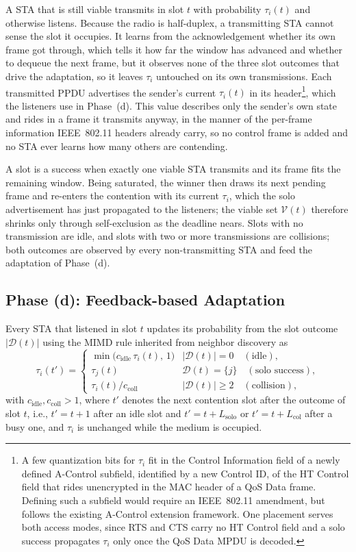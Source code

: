 \documentclass[conference]{IEEEtran}
\begin{document}
A STA that is still viable transmits in slot $t$ with probability $\tau_i(t)$ and otherwise listens. Because the radio is half-duplex, a transmitting STA cannot sense the slot it occupies. It learns from the acknowledgement whether its own frame got through, which tells it how far the window has advanced and whether to dequeue the next frame, but it observes none of the three slot outcomes that drive the adaptation, so it leaves $\tau_i$ untouched on its own transmissions. Each transmitted PPDU advertises the sender's current $\tau_i(t)$ in its header\footnote{A few quantization bits for $\tau_i$ fit in the Control Information field of a newly defined A-Control subfield, identified by a new Control ID, of the HT Control field that rides unencrypted in the MAC header of a QoS Data frame. Defining such a subfield would require an IEEE~802.11 amendment, but follows the existing A-Control extension framework. One placement serves both access modes, since RTS and CTS carry no HT Control field and a solo success propagates $\tau_i$ only once the QoS Data MPDU is decoded.}, which the listeners use in Phase~(d). This value describes only the sender's own state and rides in a frame it transmits anyway, in the manner of the per-frame information IEEE~802.11 headers already carry, so no control frame is added and no STA ever learns how many others are contending.

A slot is a success when exactly one viable STA transmits and its frame fits the remaining window. Being saturated, the winner then draws its next pending frame and re-enters the contention with its current $\tau_i$, which the solo advertisement has just propagated to the listeners; the viable set $\mathcal{V}(t)$ therefore shrinks only through self-exclusion as the deadline nears. Slots with no transmission are idle, and slots with two or more transmissions are collisions; both outcomes are observed by every non-transmitting STA and feed the adaptation of Phase~(d).

\subsection{Phase (d): Feedback-based Adaptation}
\label{subsec:adaptive_control}

Every STA that listened in slot $t$ updates its probability from the slot outcome $|\mathcal{D}(t)|$ using the MIMD rule inherited from neighbor discovery as
\begin{equation}
\tau_i(t') =
\begin{cases}
\min\bigl(c_\mathrm{idle}\,\tau_i(t),\,1\bigr) & |\mathcal{D}(t)|=0 \quad(\text{idle}),\\[2pt]
\tau_j(t)              & \mathcal{D}(t)=\{j\} \quad(\text{solo success}),\\[2pt]
\tau_i(t) / c_\mathrm{coll}          & |\mathcal{D}(t)|\ge 2 \quad(\text{collision}),
\end{cases}
\label{eq:mimd}
\end{equation}
with $c_\mathrm{idle},c_\mathrm{coll}>1$, where $t'$ denotes the next contention slot after the outcome of slot $t$, i.e., $t'=t+1$ after an idle slot and $t'=t+L_\mathrm{solo}$ or $t'=t+L_\mathrm{col}$ after a busy one, and $\tau_i$ is unchanged while the medium is occupied. 
\end{document}
